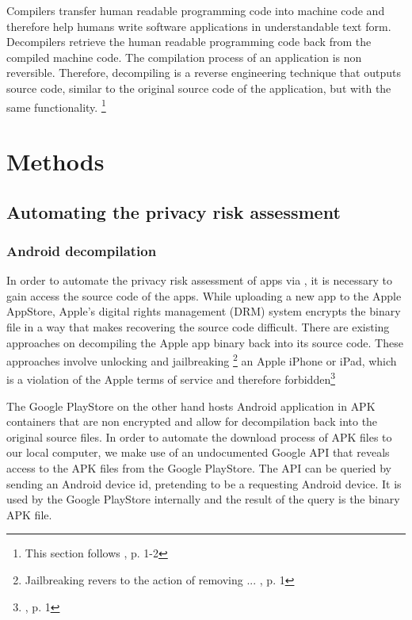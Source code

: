 \documentclass[
	a4paper,
	oneside,
	12pt,
	liststotocnumbered
]{article}
\let\cite\textcite
\begin{document}
Compilers transfer human readable programming code into machine code and therefore help humans write software applications in understandable text form. 
Decompilers retrieve the human readable programming code back from the compiled machine code. 
The compilation process of an application is non reversible. Therefore, decompiling is a reverse engineering technique that outputs source code, similar to the original source code of the application, but with the same functionality.  
\footnote{This section follows \cite{nolan2012decompiling}, p. 1-2}

\section{Methods}

\subsection{Automating the privacy risk assessment}

\subsubsection{Android decompilation}

In order to automate the privacy risk assessment of \mH apps via \sca, it is necessary to gain access the source code of the apps. 
While uploading a new app to the Apple AppStore, Apple's digital rights management (\acs{DRM}) system encrypts the binary file in a way that makes recovering the source code difficult. 
There are existing approaches on decompiling the Apple app binary back into its source code.
These approaches involve unlocking and jailbreaking
\footnote{Jailbreaking revers to the action of removing ... \cite{Kweller2010}, p. 1}
an Apple iPhone or iPad, which is a violation of the Apple terms of service and therefore forbidden\footnote{\cite{Kweller2010}, p. 1}

The Google PlayStore on the other hand hosts Android application in \acs{APK} containers that are non encrypted and allow for decompilation back into the original source files. 
In order to automate the download process of \acs{APK} files to our local computer, we make use of an undocumented Google \acs{API} that reveals access to the \acs{APK} files from the Google PlayStore. 
The \acs{API} can be queried by sending an Android device id, pretending to be a requesting Android device. It is used by the Google PlayStore internally and the result of the query is the binary \acs{APK} file.
\end{document}
